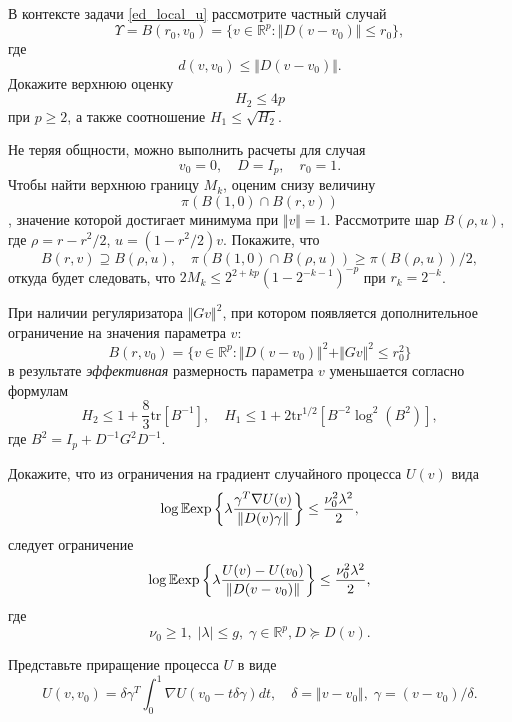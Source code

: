 \begin{problem}
В контексте задачи \ref{ed_local_u} рассмотрите частный случай 
\[
\Upsilon  = B(r_0, v_0) = \{ v \in \mathbb{R}^p : \Vert D (v - v_0) \Vert \leq r_0 \},
\]
где 
\[
d(v,v_0) \leq \Vert D (v - v_0) \Vert.
\]
Докажите верхнюю оценку \[H_2 \leq  4 p\] при $p \geq 2$, а также соотношение $H_1 \leq \sqrt{H_2}$. 
 
\end{problem}

\begin{ordre}
Не теряя общности, можно выполнить расчеты для случая
\[
v_0 = 0,
\quad D = I_p,
\quad r_0 = 1.
\]
Чтобы найти верхнюю границу $M_k$, оценим снизу величину \[\pi (B(1, 0) \cap B(r,v))\], значение которой достигает минимума при $\Vert v \Vert = 1$. 
Рассмотрите шар $B(\rho, u)$, где $\rho = r - r^2/2$, $u = (1 - r^2/2) v$.
Покажите, что 
\[
B(r, v) \supseteq B(\rho, u), 
\quad
\pi (B(1, 0) \cap B(\rho,u)) \geq \pi (B(\rho,u)) /2,
\]
откуда будет следовать, что $2M_k \leq 2^{2+kp} (1 - 2^{-k-1})^{-p}$ при $r_k = 2^{-k}$.
\end{ordre}

\begin{remark}
При наличии регуляризатора $\Vert Gv \Vert^2$, при котором появляется дополнительное ограничение на значения параметра $v$:
\[
B(r, v_0) = \{ v \in \mathbb{R}^p : \Vert D (v - v_0) \Vert^2 + \Vert Gv \Vert^2 \leq r_0^2  \} 
\] 
в результате \textit{эффективная} размерность параметра $v$ уменьшается согласно формулам
\[
H_2 \leq 1+\frac{8}{3} \text{tr} [B^{-1}],
\quad
H_1 \leq 1 + 2 \text{tr}^{1/2} [B^{-2} \log^2 (B^2)],
\]  
где $B^2 =  I_p + D^{-1} G^2 D^{-1}$.
\end{remark}

\begin{problem}
\label{ed_local_grad_u}

Докажите, что из ограничения на градиент случайного процесса $U(v)$ вида
\[
\log \mathrm{{\mathbb E}} \text{exp} \left\{\lambda \frac{\gamma^T \nabla U(v)}{\Vert D(v) \gamma \Vert} \right\} \leq 
\frac{\nu_0^2 \lambda^2}{2},
\]
следует ограничение 
\[
\log \mathrm{{\mathbb E}} \text{exp} \left\{\lambda \frac{ U(v) - U(v_0)}{\Vert D (v - v_0) \Vert} \right\} \leq 
\frac{\nu_0^2 \lambda^2}{2},
\]
где
\[
\nu_0 \geq 1, \; |\lambda| \leq g, \; \gamma \in \mathbb{R}^p, D \succcurlyeq D(v).  
\]
\end{problem}

\begin{ordre}
Представьте приращение процесса $U$ в виде
\[
U(v, v_0) = \delta \gamma^T \int_{0}^{1} \nabla U (v_0 - t \delta \gamma) dt, 
\quad \delta = \Vert v - v_0 \Vert, \; \gamma  = (v - v_0) / \delta.
\]
\end{ordre}

